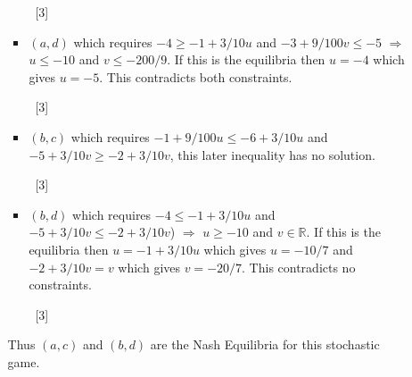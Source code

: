 \documentclass[12pt,a4paper]{article}
\makeatletter
\renewcommand{\@oddfoot}{\hfil \arabic{page} \hfil}    %
\makeatother
\begin{document}
\begin{enumerate}
\begin{enumerate}
\begin{itemize}
                ~\hfill[3]

            \item \((a,d)\) which requires \(-4\geq -1+3/10u\) and
                \(-3+9/100v\leq -5\) \(\Rightarrow\) \(u\leq -10\) and
                \(v\leq -200/9\). If this is the equilibria then \(u=-4\)
                which gives \(u=-5\). This contradicts both constraints.

                ~\hfill[3]

            \item \((b,c)\) which requires \(-1+9/100u\leq -6+3/10u\) and
                \(-5+3/10v\geq -2+3/10v\), this later inequality has no
                solution.

                ~\hfill[3]

            \item \((b,d)\) which requires \(-4\leq -1+3/10u\) and
                \(-5+3/10v\leq -2+3/10v\)) \(\Rightarrow\) \(u\geq -10\) and
                \(v \in \mathbb{R}\). If this is the equilibria then \(u=-1+3/10u\)
                which gives \(u=-10/7\) and \(-2+3/10v=v\) which gives
                \(v=-20/7\). This contradicts no constraints.

                ~\hfill[3]
        \end{itemize}

        Thus \((a,c)\) and \((b,d)\) are the Nash Equilibria for this stochastic
        game.

    \end{enumerate}
\end{enumerate}


\makeatletter
\renewcommand{\@oddfoot}{\hfil \arabic{page}X \hfil}    %
\makeatother
\end{document}
